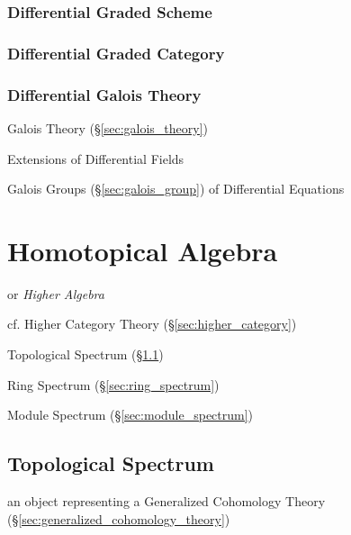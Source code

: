 \subsubsection{Differential Graded Scheme}\label{sec:differential_graded_scheme}

\subsubsection{Differential Graded Category}
\label{sec:differential_graded_category}

\subsubsection{Differential Galois Theory}\label{sec:differential_galois}

Galois Theory (\S\ref{sec:galois_theory})

Extensions of Differential Fields

Galois Groups (\S\ref{sec:galois_group}) of Differential Equations



\section{Homotopical Algebra}\label{sec:homotopical_algebra}

or \emph{Higher Algebra}

cf. Higher Category Theory (\S\ref{sec:higher_category})

Topological Spectrum (\S\ref{sec:topological_spectrum})

Ring Spectrum (\S\ref{sec:ring_spectrum})

Module Spectrum (\S\ref{sec:module_spectrum})



\subsection{Topological Spectrum}\label{sec:topological_spectrum}


an object representing a Generalized Cohomology Theory
(\S\ref{sec:generalized_cohomology_theory})

